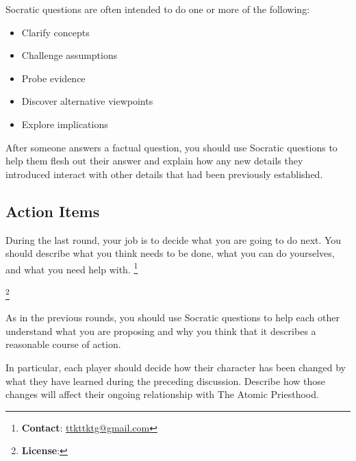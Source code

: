 \documentclass[a6paper, 11pt, parskip=half, DIV=15]{scrartcl}
\newcommand\blfootnote[1]{%
  \begingroup
  \renewcommand\thefootnote{}\footnote{#1}%
  \addtocounter{footnote}{-1}%
  \endgroup
}
\begin{document}
Socratic questions are often intended to do one or more of the following:
\begin{itemize}[nosep]
	\item Clarify concepts
	\item Challenge assumptions
	\item Probe evidence
	\item Discover alternative viewpoints
	\item Explore implications
\end{itemize}

After someone answers a factual question, you should use Socratic questions to help them flesh out their answer and explain how any new details they introduced interact with other details that had been previously established.


\newpage
\enlargethispage{1.75\baselineskip}

\subsection*{Action Items}
During the last round, your job is to decide what you are going to do next.
You should describe what you think needs to be done, what you can do yourselves, and what you need help with.
\blfootnote{\textbf{Contact}: \href{mailto:ttkttkt@gmail.com}{ttkttktg@gmail.com}}
\blfootnote{\textbf{License}: \doclicenseLongText}


As in the previous rounds, you should use Socratic questions to help each other understand what you are proposing and why you think that it describes a reasonable course of action.

In particular, each player should decide how their character has been changed by what they have learned during the preceding discussion. Describe how those changes will affect their ongoing relationship with The Atomic Priesthood.

\vfill
\end{document}
